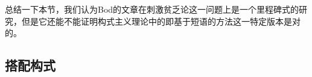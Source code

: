 \begin{exe}
\begin{xlist}[iv.]
\begin{exe}
\begin{xlist}[iv.]

总结一下本节，我们认为Bod的文章在刺激贫乏论这一问题上是一个里程碑式的研究，但是它还能不能证明构式主义理论中的即基于短语的方法这一特定版本是对的。

\subsection{搭配构式}


\end{xlist}
\end{exe}
\end{xlist}
\end{exe}

